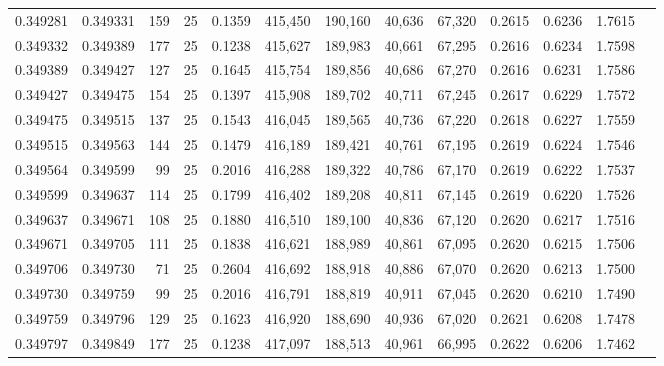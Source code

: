 \begin{tabular}{rrrrrrrrrrrrr}
0.349281 & 0.349331 &   159 &  25 &                                     0.1359 & 415,450 & 190,160 &  40,636 &  67,320 & 0.2615 & 0.6236 & 1.7615 \\
0.349332 & 0.349389 &   177 &  25 &                                     0.1238 & 415,627 & 189,983 &  40,661 &  67,295 & 0.2616 & 0.6234 & 1.7598 \\
0.349389 & 0.349427 &   127 &  25 &                                     0.1645 & 415,754 & 189,856 &  40,686 &  67,270 & 0.2616 & 0.6231 & 1.7586 \\
0.349427 & 0.349475 &   154 &  25 &                                     0.1397 & 415,908 & 189,702 &  40,711 &  67,245 & 0.2617 & 0.6229 & 1.7572 \\
0.349475 & 0.349515 &   137 &  25 &                                     0.1543 & 416,045 & 189,565 &  40,736 &  67,220 & 0.2618 & 0.6227 & 1.7559 \\
0.349515 & 0.349563 &   144 &  25 &                                     0.1479 & 416,189 & 189,421 &  40,761 &  67,195 & 0.2619 & 0.6224 & 1.7546 \\
0.349564 & 0.349599 &    99 &  25 &                                     0.2016 & 416,288 & 189,322 &  40,786 &  67,170 & 0.2619 & 0.6222 & 1.7537 \\
0.349599 & 0.349637 &   114 &  25 &                                     0.1799 & 416,402 & 189,208 &  40,811 &  67,145 & 0.2619 & 0.6220 & 1.7526 \\
0.349637 & 0.349671 &   108 &  25 &                                     0.1880 & 416,510 & 189,100 &  40,836 &  67,120 & 0.2620 & 0.6217 & 1.7516 \\
0.349671 & 0.349705 &   111 &  25 &                                     0.1838 & 416,621 & 188,989 &  40,861 &  67,095 & 0.2620 & 0.6215 & 1.7506 \\
0.349706 & 0.349730 &    71 &  25 &                                     0.2604 & 416,692 & 188,918 &  40,886 &  67,070 & 0.2620 & 0.6213 & 1.7500 \\
0.349730 & 0.349759 &    99 &  25 &                                     0.2016 & 416,791 & 188,819 &  40,911 &  67,045 & 0.2620 & 0.6210 & 1.7490 \\
0.349759 & 0.349796 &   129 &  25 &                                     0.1623 & 416,920 & 188,690 &  40,936 &  67,020 & 0.2621 & 0.6208 & 1.7478 \\
0.349797 & 0.349849 &   177 &  25 &                                     0.1238 & 417,097 & 188,513 &  40,961 &  66,995 & 0.2622 & 0.6206 & 1.7462 \\

\end{tabular}
